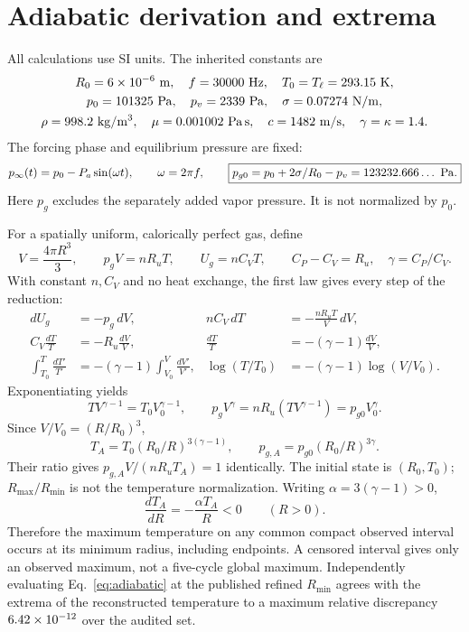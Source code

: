 \documentclass[10pt,a4paper]{article}
\begin{document}
\section{Adiabatic derivation and extrema}\label{app:adiabatic}
All calculations use SI units. The inherited constants are
\[
\begin{gathered}
R_0=6\times10^{-6}\ {\rm m},\quad f=30000\ {\rm Hz},\quad T_0=T_\ell=293.15\ {\rm K},\\
p_0=101325\ {\rm Pa},\quad p_v=2339\ {\rm Pa},\quad\sigma=0.07274\ {\rm N/m},\\
\rho=998.2\ {\rm kg/m^3},\quad\mu=0.001002\ {\rm Pa\,s},\quad c=1482\ {\rm m/s},\quad\gamma=\kappa=1.4.
\end{gathered}
\]
The forcing phase and equilibrium pressure are fixed:
\begin{equation}
p_\infty(t)=p_0-P_a\sin(\omega t),\qquad\omega=2\pi f,\qquad
\boxed{p_{g0}=p_0+2\sigma/R_0-p_v=123232.666\ldots\ {\rm Pa}.}
\end{equation}
Here $p_g$ excludes the separately added vapor pressure. It is not normalized by $p_0$.

For a spatially uniform, calorically perfect gas, define
\begin{equation}
V=\frac{4\pi R^3}{3},\qquad p_gV=nR_uT,\qquad U_g=nC_VT,\qquad
C_P-C_V=R_u,\quad\gamma=C_P/C_V.
\end{equation}
With constant $n,C_V$ and no heat exchange, the first law gives every step of the reduction:
\begin{align}
dU_g&=-p_g\,dV,&nC_V\,dT&=-\frac{nR_uT}{V}\,dV,\\
C_V\frac{dT}{T}&=-R_u\frac{dV}{V},&\frac{dT}{T}&=-(\gamma-1)\frac{dV}{V},\\
\int_{T_0}^{T}\frac{dT'}{T'}&=-(\gamma-1)\int_{V_0}^{V}\frac{dV'}{V'},&
\log(T/T_0)&=-(\gamma-1)\log(V/V_0).
\end{align}
Exponentiating yields
\begin{equation}
TV^{\gamma-1}=T_0V_0^{\gamma-1},\qquad
p_gV^\gamma=nR_u(TV^{\gamma-1})=p_{g0}V_0^\gamma.
\end{equation}
Since $V/V_0=(R/R_0)^3$,
\begin{equation}
\boxed{T_A=T_0(R_0/R)^{3(\gamma-1)}},\qquad
\boxed{p_{g,A}=p_{g0}(R_0/R)^{3\gamma}}.
\end{equation}
Their ratio gives $p_{g,A}V/(nR_uT_A)=1$ identically. The initial state is $(R_0,T_0)$; $R_{\max}/R_{\min}$ is not the temperature normalization. Writing $\alpha=3(\gamma-1)>0$,
\[
\frac{dT_A}{dR}=-\frac{\alpha T_A}{R}<0\qquad(R>0).
\]
Therefore the maximum temperature on any common compact observed interval occurs at its minimum radius, including endpoints. A censored interval gives only an observed maximum, not a five-cycle global maximum. Independently evaluating Eq.~\eqref{eq:adiabatic} at the published refined $R_{\min}$ agrees with the extrema of the reconstructed temperature to a maximum relative discrepancy $6.42\times10^{-12}$ over the audited set.
\end{document}
